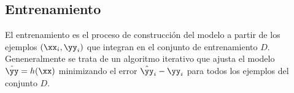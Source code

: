 %
%
\subsection{Entrenamiento}
%
El entrenamiento es el proceso de construcción del modelo a partir
de los ejemplos $(\xx_i,\yy_i)$ que integran en el conjunto de
entrenamiento $D$.
Geneneralmente se trata de un algoritmo iterativo que ajusta el 
modelo $\hat{\yy}=h(\xx)$ minimizando el error $\hat{\yy}_i-\yy_i$
para todos los ejemplos del conjunto $D$.
